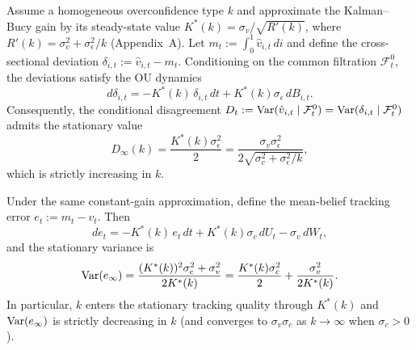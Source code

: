 \begin{proposition}
\label{prop:stationary_disagreement}
Assume a homogeneous overconfidence type $k$ and approximate the Kalman--Bucy gain by its steady-state value
$K^*(k)=\sigma_v/\sqrt{R'(k)}$, where $R'(k)=\sigma_c^2+\sigma_\epsilon^2/k$ (Appendix~A). Let
$m_t:=\int_0^1 \hat v_{i,t}\,di$ and define the cross-sectional deviation $\delta_{i,t}:=\hat v_{i,t}-m_t$.
Conditioning on the common filtration $\mathcal F_t^0$, the deviations satisfy the OU dynamics
\begin{equation}
d\delta_{i,t} = -K^*(k)\,\delta_{i,t}\,dt + K^*(k)\sigma_\epsilon\,dB_{i,t}.
\label{eq:delta_ou}
\end{equation}
Consequently, the conditional disagreement
$D_t:=\text{Var}(\hat v_{i,t}\mid \mathcal F_t^0)=\text{Var}(\delta_{i,t}\mid \mathcal F_t^0)$
admits the stationary value
\begin{equation}
D_\infty(k)=\frac{K^*(k)\sigma_\epsilon^2}{2}
=\frac{\sigma_v\sigma_\epsilon^2}{2\sqrt{\sigma_c^2+\sigma_\epsilon^2/k}},
\label{eq:D_infty}
\end{equation}
which is strictly increasing in $k$.
\end{proposition}

\begin{proposition}
\label{prop:tracking_error}
Under the same constant-gain approximation, define the mean-belief tracking error $e_t:=m_t-v_t$. Then
\begin{equation}
de_t = -K^*(k)\,e_t\,dt + K^*(k)\sigma_c\,dU_t - \sigma_v\,dW_t,
\label{eq:e_ou}
\end{equation}
and the stationary variance is
\begin{equation}
\text{Var}(e_\infty)=\frac{(K^*(k))^2\sigma_c^2+\sigma_v^2}{2K^*(k)}
=\frac{K^*(k)\sigma_c^2}{2}+\frac{\sigma_v^2}{2K^*(k)}.
\label{eq:Var_e_infty}
\end{equation}
In particular, $k$ enters the stationary tracking quality through $K^*(k)$ and $\text{Var}(e_\infty)$ is strictly decreasing in $k$ (and converges to $\sigma_v\sigma_c$ as $k\to\infty$ when $\sigma_c>0$).
\end{proposition}

